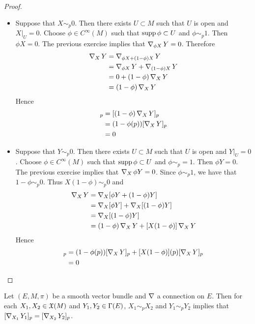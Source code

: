 \documentclass{book}
\begin{document}
	\begin{proof}\
		\begin{itemize}
			\item Suppose that $X \sim_p 0$. Then there exists $U \subset M$ such that $U$ is open and $X|_U = 0$. Choose $\phi  \in C^{\infty}(M)$ such that $\operatorname{supp} \phi  \subset U$ and $\phi \sim_p 1$. Then $\phi  X = 0$. The previous exercise implies that $\operatorname{\nabla}_{\phi  X} Y = 0$. Therefore
			\begin{align*}
				\operatorname{\nabla}_X Y
				& = \operatorname{\nabla}_{\phi  X + (1- \phi )X}Y \\
				& = \operatorname{\nabla}_{\phi  X}Y + \operatorname{\nabla}_{(1 - \phi ) X}Y \\
				& = 0 + (1 - \phi )\operatorname{\nabla}_X Y \\
				& = (1 - \phi )\operatorname{\nabla}_X Y \\
			\end{align*}
			Hence 
			\begin{align*}
				[\nab_X Y]_p
				& =[(1 - \phi )\nab_X Y]_p \\
				& = (1 - \phi (p))[\nab_X Y]_p \\
				& = 0 
			\end{align*} 
			\item Suppose that $Y \sim_p 0$. Then there exists $U \subset M$ such that $U$ is open and $Y|_U = 0$. Choose $\phi \in C^{\infty}(M)$ such that $\operatorname{supp} \phi  \subset U$ and $\phi \sim_p = 1$. Then $\phi  Y = 0$. The previous exercise implies that $\operatorname{\nabla}_X \phi Y = 0$. Since $\phi \sim_p 1$, we have that $1 - \phi \sim_p 0$. Thus $X (1 - \phi) \sim_p 0$ and 
			\begin{align*}
				\operatorname{\nabla}_X Y
				& = \operatorname{\nabla}_X [\phi Y + (1- \phi)Y] \\
				& = \operatorname{\nabla}_X [\phi Y] + \operatorname{\nabla}_X[(1 - \phi) Y] \\
				& = \operatorname{\nabla}_X[(1 - \phi) Y] \\
				& = (1- \phi) \operatorname{\nabla}_X Y + [X(1 - \phi)] \operatorname{\nabla}_X Y \\
			\end{align*}
			Hence
			\begin{align*}
				[\nab_X Y]_p
				& = (1- \phi(p)) [\nab_X Y]_p + [X(1 - \phi)](p) [\nab_X Y]_p \\ 
				& = 0
			\end{align*} 
		\end{itemize}
	\end{proof}

	\begin{ex}
		Let $(E, M, \pi)$ be a smooth vector bundle and $\operatorname{\nabla}$ a connection on $E$. Then for each $X_1, X_2 \in \mathfrak{X}(M)$ and $Y_1, Y_2 \in \Gamma(E)$, $X_1 \sim_p X_2$ and $Y_1 \sim_p Y_2$ implies that $[\operatorname{\nabla}_{X_1}Y_1]_p = [\operatorname{\nabla}_{X_2}Y_2]_p $.
	\end{ex}
\end{document}
